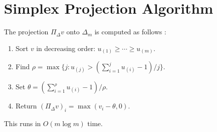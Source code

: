 \documentclass[twocolumn,11pt,a4paper]{article}
\theoremstyle{plain}
\theoremstyle{definition}
\theoremstyle{remark}
\newcommand{\proj}{\Pi_{\Delta}}     %
\newcommand{\Deltam}{\Delta_m}
\begin{document}
\section{Simplex Projection Algorithm}
\label{app:simplex}

The projection $\proj v$ onto $\Deltam$ is computed as follows
\cite{BauschkeCombettes2011}:
\begin{enumerate}
  \item Sort $v$ in decreasing order: $u_{(1)}\ge\cdots\ge u_{(m)}$.
  \item Find $\rho=\max\{j:u_{(j)}>(\sum_{i=1}^j u_{(i)}-1)/j\}$.
  \item Set $\theta=(\sum_{i=1}^\rho u_{(i)}-1)/\rho$.
  \item Return $(\proj v)_i=\max(v_i-\theta,0)$.
\end{enumerate}
This runs in $O(m\log m)$ time.



\end{document}
